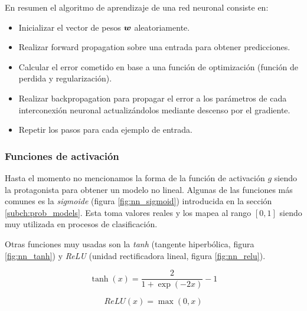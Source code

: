 En resumen el algoritmo de aprendizaje de una red neuronal consiste en:

\begin{itemize}
    \item Inicializar el vector de pesos $\boldsymbol{w}$ aleatoriamente.
    \item Realizar forward propagation sobre una entrada para obtener
    predicciones.
    \item Calcular el error cometido en base a una función de optimización
    (función de perdida y regularización).
    \item Realizar backpropagation para propagar el error a los parámetros de
    cada interconexión neuronal actualizándolos mediante descenso por el
    gradiente.
    \item Repetir los pasos para cada ejemplo de entrada.
\end{itemize}

\subsubsection{Funciones de activación}

Hasta el momento no mencionamos la forma de la función de activación $g$ siendo
la protagonista para obtener un modelo no lineal. Algunas de las funciones más
comunes es la \emph{sigmoide} (figura \ref{fig:nn_sigmoid}) introducida en la
sección \ref{subch:prob_models}. Esta toma valores reales y los mapea al rango
$[0, 1]$ siendo muy utilizada en procesos de clasificación.

Otras funciones muy usadas son la \emph{tanh} (tangente hiperbólica, figura
\ref{fig:nn_tanh}) y \emph{ReLU} (unidad rectificadora lineal, figura
\ref{fig:nn_relu}).

\begin{equation}
    \tanh\left( x \right) = \frac{2}{1 + \exp(-2x)} - 1
\end{equation}

\begin{equation}
    ReLU\left( x \right) = \max(0, x)
\end{equation}

